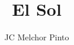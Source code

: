 \documentclass[12pt,addpoints,answers]{guia}
\title{El Sol}
\author{JC Melchor Pinto}
\begin{document}
\INFO%
\begin{questions}
    \questionboxed[25]{}
    \questionboxed[25]{}
\end{questions}
\end{document}
